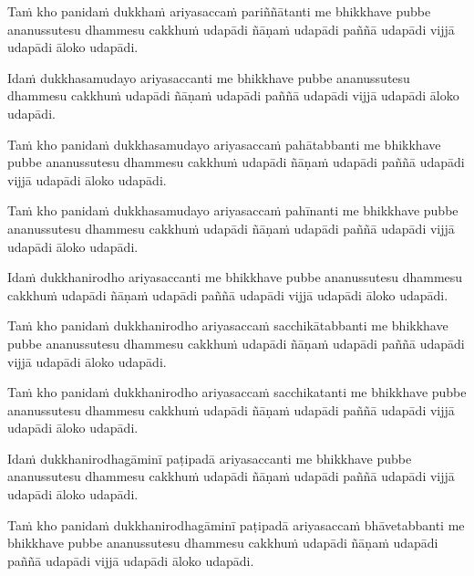 \begin{pali-hang}
  Taṁ kho panidaṁ dukkhaṁ ariyasaccaṁ pariññātanti me bhikkhave pubbe ananussutesu dhammesu cakkhuṁ udapādi ñāṇaṁ udapādi paññā udapādi vijjā udapādi āloko udapādi.
\end{pali-hang}

\begin{pali-hang}
  Idaṁ dukkhasamudayo ariyasaccanti me bhikkhave pubbe ananussutesu dhammesu cakkhuṁ udapādi ñāṇaṁ udapādi paññā udapādi vijjā udapādi āloko udapādi.
\end{pali-hang}

\begin{pali-hang}
  Taṁ kho panidaṁ dukkhasamudayo ariyasaccaṁ pahātabbanti me bhikkhave pubbe ananussutesu dhammesu cakkhuṁ udapādi ñāṇaṁ udapādi paññā udapādi vijjā udapādi āloko udapādi.
\end{pali-hang}

\begin{pali-hang}
  Taṁ kho panidaṁ dukkhasamudayo ariyasaccaṁ pahīnanti me bhikkhave pubbe ananussutesu dhammesu cakkhuṁ udapādi ñāṇaṁ udapādi paññā udapādi vijjā udapādi āloko udapādi.
\end{pali-hang}

\begin{pali-hang}
  Idaṁ dukkhanirodho ariyasaccanti me bhikkhave pubbe ananussutesu dhammesu cakkhuṁ udapādi ñāṇaṁ udapādi paññā udapādi vijjā udapādi āloko udapādi.
\end{pali-hang}

\begin{pali-hang}
  Taṁ kho panidaṁ dukkhanirodho ariyasaccaṁ sacchikātabbanti me bhikkhave pubbe ananussutesu dhammesu cakkhuṁ udapādi ñāṇaṁ udapādi paññā udapādi vijjā udapādi āloko udapādi.
\end{pali-hang}

\begin{pali-hang}
  Taṁ kho panidaṁ dukkhanirodho ariyasaccaṁ sacchikatanti me bhikkhave pubbe ananussutesu dhammesu cakkhuṁ udapādi ñāṇaṁ udapādi paññā udapādi vijjā udapādi āloko udapādi.
\end{pali-hang}

\begin{pali-hang}
  Idaṁ dukkhanirodhagāminī paṭipadā ariyasaccanti me bhikkhave pubbe ananussutesu dhammesu cakkhuṁ udapādi ñāṇaṁ udapādi paññā udapādi vijjā udapādi āloko udapādi.
\end{pali-hang}

\begin{pali-hang}
  Taṁ kho panidaṁ dukkhanirodhagāminī paṭipadā ariyasaccaṁ bhāvetabbanti me bhikkhave pubbe ananussutesu dhammesu cakkhuṁ udapādi ñāṇaṁ udapādi paññā udapādi vijjā udapādi āloko udapādi.
\end{pali-hang}


